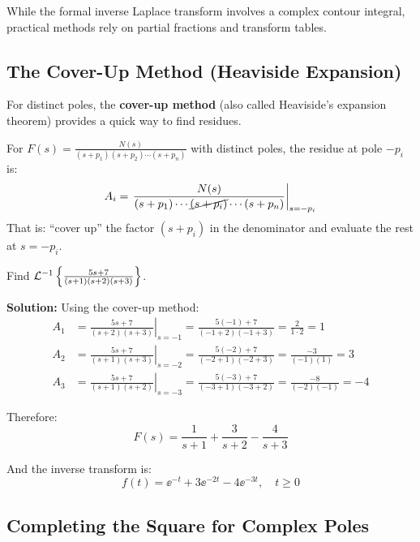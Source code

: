 While the formal inverse Laplace transform involves a complex contour integral, practical methods rely on partial fractions and transform tables.

\subsection{The Cover-Up Method (Heaviside Expansion)}

For distinct poles, the \textbf{cover-up method} (also called Heaviside's expansion theorem) provides a quick way to find residues.

\begin{keyconceptbox}[title=Cover-Up Method]
For $F(s) = \frac{N(s)}{(s+p_1)(s+p_2)\cdots(s+p_n)}$ with distinct poles, the residue at pole $-p_i$ is:
\begin{equation}
A_i = \left. \frac{N(s)}{(s+p_1)\cdots\cancel{(s+p_i)}\cdots(s+p_n)} \right|_{s=-p_i}
\end{equation}
That is: ``cover up'' the factor $(s+p_i)$ in the denominator and evaluate the rest at $s = -p_i$.
\end{keyconceptbox}

\begin{examplebox}[title=Example: Cover-Up Method]
Find $\mathcal{L}^{-1}\left\{ \frac{5s + 7}{(s+1)(s+2)(s+3)} \right\}$.

\textbf{Solution:}
Using the cover-up method:
\begin{align}
A_1 &= \left. \frac{5s+7}{(s+2)(s+3)} \right|_{s=-1} = \frac{5(-1)+7}{(-1+2)(-1+3)} = \frac{2}{1 \cdot 2} = 1 \\[6pt]
A_2 &= \left. \frac{5s+7}{(s+1)(s+3)} \right|_{s=-2} = \frac{5(-2)+7}{(-2+1)(-2+3)} = \frac{-3}{(-1)(1)} = 3 \\[6pt]
A_3 &= \left. \frac{5s+7}{(s+1)(s+2)} \right|_{s=-3} = \frac{5(-3)+7}{(-3+1)(-3+2)} = \frac{-8}{(-2)(-1)} = -4
\end{align}

Therefore:
\begin{equation}
F(s) = \frac{1}{s+1} + \frac{3}{s+2} - \frac{4}{s+3}
\end{equation}

And the inverse transform is:
\begin{equation}
\boxed{f(t) = \ee^{-t} + 3\ee^{-2t} - 4\ee^{-3t}, \quad t \geq 0}
\end{equation}
\end{examplebox}

\subsection{Completing the Square for Complex Poles}

